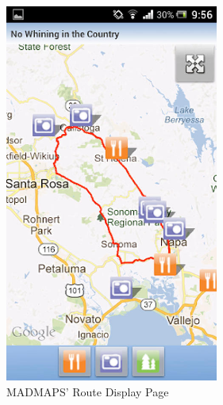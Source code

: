 \documentclass[a4paper,twoside,notitlepage,11pt]{article}
\begin{document}
\begin{figure}[!ht]
\begin{minipage}{.49\textwidth}
\begin{center}
			\includegraphics[width=0.625\textwidth]{images/mm-2.png}
			\caption{MADMAPS' Route Display Page}
		\end{center}
	\end{minipage}
\end{figure}
\end{document}
